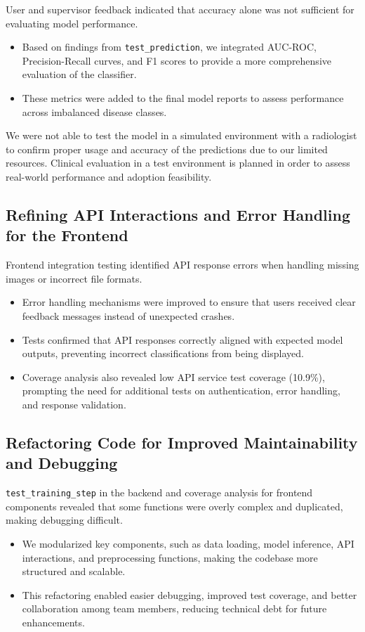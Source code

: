 \documentclass[12pt, titlepage]{article}
\begin{document}
User and supervisor feedback indicated that accuracy alone was not sufficient for evaluating model performance.
\begin{itemize}
    \item Based on findings from \texttt{test\_prediction}, we integrated AUC-ROC, Precision-Recall curves, and F1 scores to provide a more comprehensive evaluation of the classifier.
    \item These metrics were added to the final model reports to assess performance across imbalanced disease classes.
\end{itemize}

We were not able to test the model in a simulated environment with a radiologist to confirm proper usage and accuracy of the predictions due to our limited resources. Clinical evaluation in a test environment is planned in order to assess real-world performance and adoption feasibility.

\subsection{Refining API Interactions and Error Handling for the Frontend}

Frontend integration testing identified API response errors when handling missing images or incorrect file formats.
\begin{itemize}
    \item Error handling mechanisms were improved to ensure that users received clear feedback messages instead of unexpected crashes.
    \item Tests confirmed that API responses correctly aligned with expected model outputs, preventing incorrect classifications from being displayed.
    \item Coverage analysis also revealed low API service test coverage (10.9\%), prompting the need for additional tests on authentication, error handling, and response validation.
\end{itemize}

\subsection{Refactoring Code for Improved Maintainability and Debugging}

\texttt{test\_training\_step} in the backend and coverage analysis for frontend components revealed that some functions were overly complex and duplicated, making debugging difficult.
\begin{itemize}
    \item We modularized key components, such as data loading, model inference, API interactions, and preprocessing functions, making the codebase more structured and scalable.
    \item This refactoring enabled easier debugging, improved test coverage, and better collaboration among team members, reducing technical debt for future enhancements.
\end{itemize}
\end{document}
